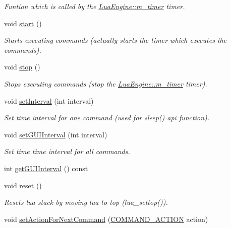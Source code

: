 \begin{DoxyCompactItemize}
\begin{DoxyCompactList}\small\item\em Funtion which is called by the \hyperlink{class_lua_engine_a367284a1461c5a2d2804c3f9b4d94f14}{Lua\-Engine\-::m\-\_\-timer} timer. \end{DoxyCompactList}\item 
void \hyperlink{class_lua_engine_a28e0795b54170d763a929256566fe2b5}{start} ()
\begin{DoxyCompactList}\small\item\em Starts executing commands (actually starts the timer which executes the commands). \end{DoxyCompactList}\item 
void \hyperlink{class_lua_engine_a5822af655fb7b474766e39b44be56a6a}{stop} ()
\begin{DoxyCompactList}\small\item\em Stops executing commands (stop the \hyperlink{class_lua_engine_a367284a1461c5a2d2804c3f9b4d94f14}{Lua\-Engine\-::m\-\_\-timer} timer). \end{DoxyCompactList}\item 
void \hyperlink{class_lua_engine_a0b87a8b474070665af6e435a2c5bce56}{set\-Interval} (int interval)
\begin{DoxyCompactList}\small\item\em Set time interval for one command (used for sleep() api function). \end{DoxyCompactList}\item 
void \hyperlink{class_lua_engine_ac29f2b09b45797aac68bd5caa6fe2c90}{set\-G\-U\-I\-Interval} (int interval)
\begin{DoxyCompactList}\small\item\em Set time time interval for all commands. \end{DoxyCompactList}\item 
int \hyperlink{class_lua_engine_a613b53ffedc45c8cf800e99aa42408c5}{get\-G\-U\-I\-Interval} () const 
\item 
void \hyperlink{class_lua_engine_ab598de2b82cdf3ea3c67244669a31194}{reset} ()
\begin{DoxyCompactList}\small\item\em Resets lua stack by moving lua to top (lua\-\_\-settop()). \end{DoxyCompactList}\item 
void \hyperlink{class_lua_engine_ac0cfa803159af14022cb08a7442f288b}{set\-Action\-For\-Next\-Command} (\hyperlink{class_lua_engine_a3410f0b2ab8ca7641b79653451490d90}{C\-O\-M\-M\-A\-N\-D\-\_\-\-A\-C\-T\-I\-O\-N} action)

\end{DoxyCompactItemize}
